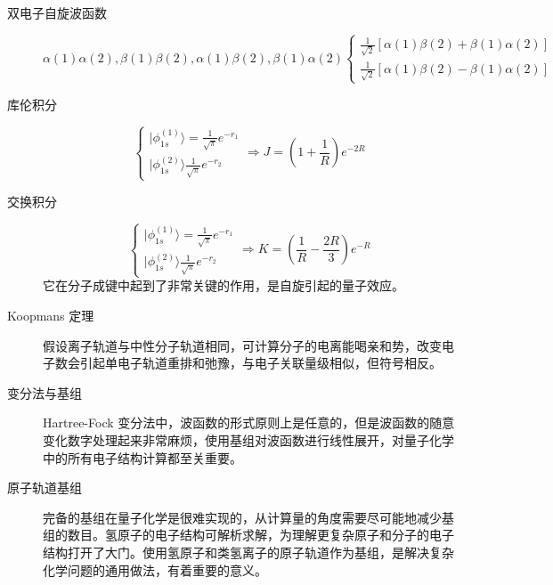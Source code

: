 \documentclass{article}
\numberwithin{equation}{section}
\newcommand{\ket}[1]{| #1 \rangle}
\begin{document}
\begin{description}
      \item[双电子自旋波函数]
      \begin{equation}
        \alpha(1)\alpha(2),\beta(1)\beta(2),\alpha(1)\beta(2),\beta(1)\alpha(2)
        \begin{cases}
        \frac{1}{\sqrt{2}}[\alpha(1)\beta(2)+\beta(1)\alpha(2)]\\
        \frac{1}{\sqrt{2}}[\alpha(1)\beta(2)-\beta(1)\alpha(2)]
        \end{cases}
      \end{equation}
  
    \end{description}
    \begin{description}
    \item[库伦积分]
    \begin{equation}
    \begin{cases}
    \ket{\phi_{1s}^{(1)}}=\frac{1}{\sqrt{\pi}}e^{-r_1}\\
    \ket{\phi_{1s}^{(2)}}\frac{1}{\sqrt{\pi}}e^{-r_2}
    \end{cases}
    \Rightarrow J=(1+\frac{1}{R})e^{-2R}
    \end{equation}
  
    \item[交换积分]
    \begin{equation}
    \begin{cases}
    \ket{\phi_{1s}^{(1)}}=\frac{1}{\sqrt{\pi}}e^{-r_1}\\
    \ket{\phi_{1s}^{(2)}}\frac{1}{\sqrt{\pi}}e^{-r_2}
    \end{cases}
    \Rightarrow K=(\frac{1}{R}-\frac{2R}{3})e^{-R}
    \end{equation}
    它在分子成键中起到了非常关键的作用，是自旋引起的量子效应。

    \item[Koopmans 定理]假设离子轨道与中性分子轨道相同，可计算分子的电离能喝亲和势，改变电子数会引起单电子轨道重排和弛豫，与电子关联量级相似，但符号相反。

    \item[变分法与基组] Hartree-Fock 变分法中，波函数的形式原则上是任意的，但是波函数的随意变化数字处理起来非常麻烦，使用基组对波函数进行线性展开，对量子化学中的所有电子结构计算都至关重要。
  
    \item[原子轨道基组] 完备的基组在量子化学是很难实现的，从计算量的角度需要尽可能地减少基组的数目。氢原子的电子结构可解析求解，为理解更复杂原子和分子的电子结构打开了大门。使用氢原子和类氢离子的原子轨道作为基组，是解决复杂化学问题的通用做法，有着重要的意义。
  

\end{description}
\end{document}
